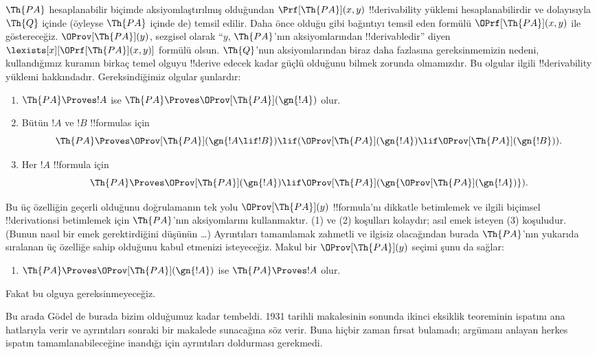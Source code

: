 \documentclass[../../../include/open-logic-section]{subfiles}
\begin{document}
$\Th{PA}$ hesaplanabilir biçimde aksiyomlaştırılmış olduğundan
$\Prf[\Th{PA}](x,y)$ !!{derivability} yüklemi hesaplanabilirdir ve dolayısıyla
$\Th{Q}$ içinde (öyleyse $\Th{PA}$ içinde de) temsil edilir. Daha önce olduğu
gibi bağıntıyı temsil eden formülü $\OPrf[\Th{PA}](x,y)$ ile göstereceğiz.
$\OProv[\Th{PA}](y)$, sezgisel olarak ``$y$, $\Th{PA}$'nın aksiyomlarından
!!{derivable}{}dir'' diyen $\lexists[x][\OPrf[\Th{PA}](x,y)]$ formülü olsun.
$\Th{Q}$'nun aksiyomlarından biraz daha fazlasına gereksinmemizin nedeni,
kullandığımız kuramın birkaç temel olguyu !!{derive} edecek kadar güçlü
olduğunu bilmek zorunda olmamızdır. Bu olgular ilgili !!{derivability}
yüklemi hakkındadır.
Gereksindiğimiz olgular şunlardır:
\begin{enumerate}
\item[P1.] $\Th{PA} \Proves !A$ ise $\Th{PA} \Proves
  \OProv[\Th{PA}](\gn{!A})$ olur.
\item[P2.] Bütün $!A$ ve $!B$ !!{formula}s için
  \[
  \Th{PA} \Proves \OProv[\Th{PA}](\gn{!A \lif !B}) \lif
  (\OProv[\Th{PA}](\gn{!A}) \lif \OProv[\Th{PA}](\gn{!B})).
  \]
\item[P3.] Her $!A$ !!{formula} için
  \[
  \Th{PA} \Proves \OProv[\Th{PA}](\gn{!A})
  \lif \OProv[\Th{PA}](\gn{\OProv[\Th{PA}](\gn{!A})}).
  \]
\end{enumerate}
Bu üç özelliğin geçerli olduğunu doğrulamanın tek yolu
$\OProv[\Th{PA}](y)$ !!{formula}'nı dikkatle betimlemek ve ilgili biçimsel
!!{derivation}s{}i betimlemek için $\Th{PA}$'nın aksiyomlarını kullanmaktır.
(1) ve (2) koşulları kolaydır; asıl emek isteyen (3) koşuludur. (Bunun nasıl
bir emek gerektirdiğini düşünün \dots) Ayrıntıları tamamlamak zahmetli ve
ilgisiz olacağından burada $\Th{PA}$'nın yukarıda sıralanan üç özelliğe sahip
olduğunu kabul etmenizi isteyeceğiz. Makul bir $\OProv[\Th{PA}](y)$ seçimi
şunu da sağlar:
\begin{enumerate}
\item[P4.] $\Th{PA} \Proves \OProv[\Th{PA}](\gn{!A})$ ise
  $\Th{PA} \Proves !A$ olur.
\end{enumerate}
Fakat bu olguya gereksinmeyeceğiz.

\begin{digress}
Bu arada G\"odel de burada bizim olduğumuz kadar tembeldi. 1931 tarihli
makalesinin sonunda ikinci eksiklik teoreminin ispatını ana hatlarıyla verir
ve ayrıntıları sonraki bir makalede sunacağına söz verir. Buna hiçbir zaman
fırsat bulamadı; argümanı anlayan herkes ispatın tamamlanabileceğine inandığı
için ayrıntıları doldurması gerekmedi.
\end{digress}
\end{document}
